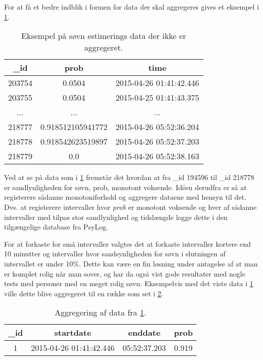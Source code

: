 For at få et bedre indblik i formen for data der skal aggregeres gives et eksempel i \cref{tab:noaggsoevndata}.
\begin{table}[h]
	\centering
\begin{tabular}{|c|c|c|}
	\hline {\_}id & prob & time \\ 
	\hline 203754 & 0.0504 & 2015-04-26 01:41:42.446 \\ 
	\hline 203755 & 0.0504 & 2015-04-25 01:41:43.375 \\ 
	\hline ... & ... & ... \\ 
	\hline 218777 & 0.918512105941772 & 2015-04-26 05:52:36.204 \\ 
	\hline 218778 & 0.918542623519897 & 2015-04-26 05:52:37.203 \\ 
	\hline 218779 & 0.0 & 2015-04-26 05:52:38.163 \\ 
	\hline 
\end{tabular}
\caption{Eksempel på søvn estimerings data der ikke er aggregeret.}\label{tab:noaggsoevndata}
\end{table}
Ved at se på data som i \cref{tab:noaggsoevndata} fremstår det hvordan at fra {\_}id 194596 til {\_}id 218778 er sandlynligheden for søvn, prob, monotont voksende.
Idéen derudfra er så at registerere sådanne monotoniforhold og aggregere dataene med hensyn til det.
Dvs. at registerere intervaller hvor \textit{prob} er monotont voksende og hver af sådanne intervaller med tilpas stor sandlynlighed og tidslængde logge dette i den tilgængelige database fra PsyLog.

For at forkaste for små intervaller valgtes det at forkaste intervaller kortere end 10 minutter og intervaller hvor sandsynligheden for søvn i slutningen af intervallet er under 10\%.
Dette kan være en fin løsning under antagelse af at man  er komplet rolig når man sover, og har da også vist gode resultater med nogle tests med personer med en meget rolig søvn. Eksempelvis med det viste data i  \cref{tab:noaggsoevndata} ville dette blive aggregeret til en række som set i \cref{tab:aggdat}.

\begin{table}[h]
	\centering
\begin{tabular}{|c|c|c|c|}
	\hline {\_}id & startdate & enddate & prob \\ 
	\hline 1 & 2015-04-26 01:41:42.446 &  05:52:37.203 & 0.919 \\ 
	\hline 
\end{tabular} 
\caption{Aggregering af data fra \cref{tab:noaggsoevndata}.}\label{tab:aggdat}
\end{table}

